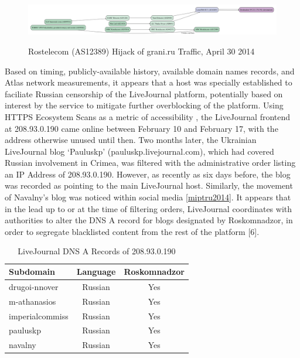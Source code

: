 \begin{figure}
  \includegraphics[width=\textwidth]{resources/atlas_cache-results-measurement_id-1663748.png}
  \label{image:ru-grani-hijack}
  \caption{Rostelecom (AS12389) Hijack of grani.ru Traffic, April 30 2014}
\end{figure}

Based on timing, publicly-available history, available domain names records, and Atlas network measurements, it appears that a host was specially established to faciliate Russian censorship of the LiveJournal platform, potentially based on interest by the service to mitigate further overblocking of the platform. Using HTTPS Ecosystem Scans as a metric of accessibility \cite{projectsonar}, the LiveJournal frontend at 208.93.0.190 came online between February 10 and February 17, with the address otherwise unused until then. Two months later, the Ukrainian LiveJournal blog `Pauluskp' (pauluskp.livejournal.com), which had covered Russian involvement in Crimea, was filtered with the administrative order listing an IP Address of 208.93.0.190. However, as recently as six days before, the blog was recorded as pointing to the main LiveJournal host. Similarly, the movement of Navalny's blog was noticed within social media \ref{miptru2014}. It appears that in the lead up to or at the time of filtering orders, LiveJournal coordinates with authorities to alter the DNS A record for blogs designated by Roskomnadzor, in order to segregate blacklisted content from the rest of the platform [6].

\begin{table}
    \begin{tabular}{| l | c | c |}
        \hline
        Subdomain & Language & Roskomnadzor\\
        \hline
        drugoi-nnover & Russian & Yes\\
        m-athanasios & Russian & Yes\\
        imperialcommiss & Russian & Yes\\
        pauluskp & Russian & Yes \\
        navalny & Russian & Yes \\
        \hline
    \end{tabular}
    \label{table:lj-blocked-blogs}
    \caption{LiveJournal DNS A Records of 208.93.0.190}
\end{table}

